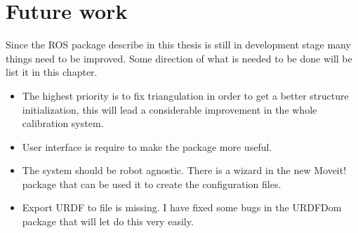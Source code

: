 \chapter{Future work}
\label{cha:future}

Since the ROS package describe in this thesis is still in development stage many things need to be improved. Some direction of what is needed to be done will be list it in this chapter.

\begin{itemize}
 \item The highest priority is to fix triangulation in order to get a better structure initialization, this will lead a considerable improvement in the whole calibration system.


 \item User interface is require to make the package more useful.

 \item The system should be robot agnostic. There is a wizard in the new Moveit! package that can be used it to create the configuration files.

 \item Export URDF to file is missing. I have fixed some bugs in the URDFDom package that will let do this very easily.

\end{itemize}
